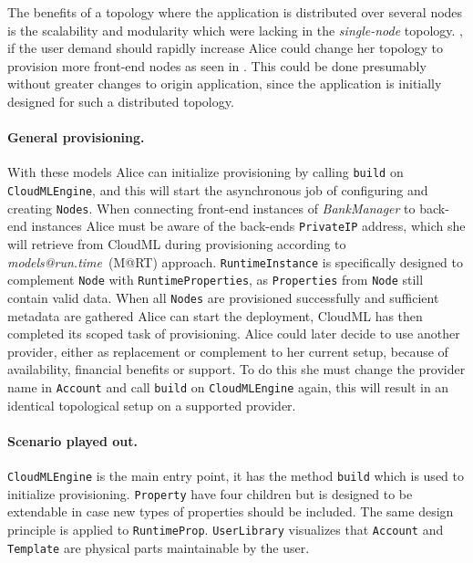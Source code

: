 The benefits of a topology where the application is distributed over several nodes 
is the scalability and modularity which were lacking in the \emph{single-node} topology.
\eg, if the user demand should rapidly increase Alice could change her topology to
provision more front-end nodes as seen in .
This could be done presumably without greater changes to origin application,
since the application is initially designed for such a distributed topology.

\paragraph{General provisioning.}

With these models Alice can initialize provisioning by calling 
\texttt{build} on \texttt{CloudMLEngine},
and this will start the asynchronous job of configuring and creating \texttt{Nodes}.
When connecting front-end instances of \emph{BankManager} to back-end instances Alice must 
be aware of the back-ends \texttt{PrivateIP} address, which she will retrieve from CloudML
during provisioning according to \emph{models@run.time}~(M@RT) approach.
\texttt{RuntimeInstance} is specifically designed to complement \texttt{Node} with \texttt{RuntimeProperties},
as \texttt{Properties} from \texttt{Node} still contain valid data.
When all \texttt{Nodes} are provisioned successfully and sufficient metadata are gathered
Alice can start the deployment, CloudML has then completed its scoped task of provisioning.
Alice could later decide to use another provider, either as replacement or complement to her current setup,
because of availability, financial benefits or support.
To do this she must change the provider name in \texttt{Account} and call \texttt{build} on \texttt{CloudMLEngine} again,
this will result in an identical topological setup on a supported provider.

\paragraph{Scenario played out.}



\texttt{CloudMLEngine} is the main entry point, it has the method \texttt{build}
which is used to initialize provisioning.
\texttt{Property} have four children but is designed to be extendable in case
new types of properties should be included. The same design principle
is applied to \texttt{RuntimeProp}.
\texttt{UserLibrary} visualizes that \texttt{Account} and \texttt{Template} are 
physical parts maintainable by the user.

